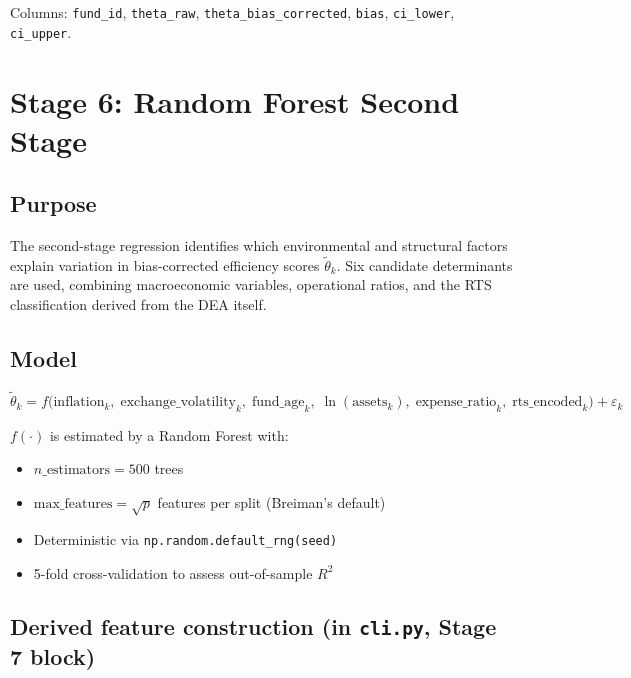 \documentclass[12pt,a4paper]{article}
\begin{document}
Columns: \texttt{fund\_id}, \texttt{theta\_raw}, \texttt{theta\_bias\_corrected},
\texttt{bias}, \texttt{ci\_lower}, \texttt{ci\_upper}.

\section{Stage 6: Random Forest Second Stage}

\subsection{Purpose}

The second-stage regression identifies which environmental and structural factors
explain variation in bias-corrected efficiency scores $\tilde{\theta}_k$.
Six candidate determinants are used, combining macroeconomic variables, operational
ratios, and the RTS classification derived from the DEA itself.

\subsection{Model}

\[
    \tilde{\theta}_k = f\!\bigl(
        \text{inflation}_k,\;
        \text{exchange\_volatility}_k,\;
        \text{fund\_age}_k,\;
        \ln(\text{assets}_k),\;
        \text{expense\_ratio}_k,\;
        \text{rts\_encoded}_k
    \bigr) + \varepsilon_k
\]

$f(\cdot)$ is estimated by a Random Forest with:
\begin{itemize}
    \item $n\_\text{estimators} = 500$ trees
    \item $\text{max\_features} = \sqrt{p}$ features per split (Breiman's default)
    \item Deterministic via \texttt{np.random.default\_rng(seed)}
    \item 5-fold cross-validation to assess out-of-sample $R^2$
\end{itemize}

\subsection{Derived feature construction (in \texttt{cli.py}, Stage 7 block)}
\end{document}

